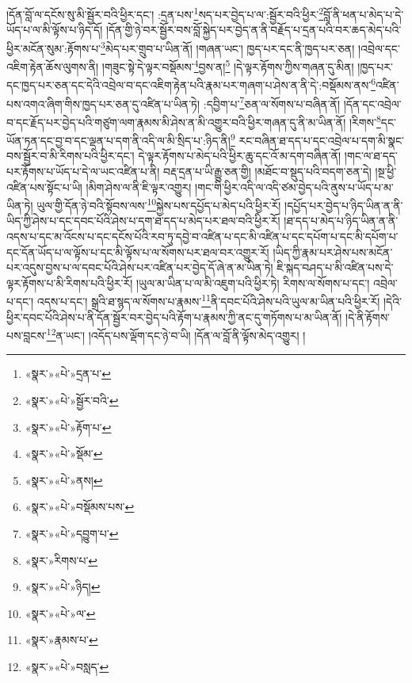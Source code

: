 །དོན་བློ་ལ་དངོས་སུ་མི་སྦྱོར་བའི་ཕྱིར་དང་། :དྲན་པས་\footnote{«སྣར་»«པེ་»དྲན་པ་}སད་པར་བྱེད་པ་ལ་:སྦྱོར་བའི་ཕྱིར་\footnote{«སྣར་»«པེ་»སྦྱོར་བའི་}བློ་ནི་ཕན་པ་མེད་པ་དེ་ཡོད་པ་ལ་མི་ལྟོས་པ་ཉིད་དོ། །དོན་གྱི་ཉེ་བར་སྦྱོར་བས་བློ་སྐྱེད་པར་བྱེད་ན་ནི་བརྗོད་པ་དྲན་པའི་བར་ཆད་མེད་པའི་ཕྱིར་མངོན་སུམ་:རྟོགས་པ་\footnote{«སྣར་»«པེ་»རྟོག་པ་}མེད་པར་གྲུབ་པ་ཡིན་ནོ། །གཞན་ཡང་། ཁྱད་པར་དང་ནི་ཁྱད་པར་ཅན། །འབྲེལ་དང་འཇིག་རྟེན་ཆོས་ལུགས་ནི། །གཟུང་སྟེ་དེ་ལྟར་བསྡོམས་\footnote{«སྣར་»«པེ་»སྡོམ་}བྱས་ན།\footnote{«སྣར་»«པེ་»ནས།} །དེ་ལྟར་རྟོགས་ཀྱིས་གཞན་དུ་མིན། །ཁྱད་པར་དང་ཁྱད་པར་ཅན་དང་དེའི་འབྲེལ་བ་དང་འཇིག་རྟེན་པའི་རྣམ་པར་གཞག་པ་ཤེས་ན་ནི་དེ་:བསྡོམས་ནས་\footnote{«སྣར་»«པེ་»བསྡོམས་པས་}འཛིན་པས་འགའ་ཞིག་གིས་ཁྱད་པར་ཅན་དུ་འཛིན་པ་ཡིན་ཏེ། :དབྱིག་པ་\footnote{«སྣར་»«པེ་»དབྱུག་པ་}ཅན་ལ་སོགས་པ་བཞིན་ནོ། །དོན་དང་འབྲེལ་བ་དང་རྗོད་པར་བྱེད་པའི་གཙུག་ལག་རྣམས་མི་ཤེས་ན་མི་འགྱུར་བའི་ཕྱིར་གཞན་དུ་ནི་མ་ཡིན་ནོ། །རིགས་\footnote{«སྣར་»རིགས་པ་}དང་ཡོན་ཏན་དང་བྱ་བ་དང་ལྡན་པ་དག་ནི་འདི་ལ་མི་སྲིད་པ་:ཉིད་ནི།\footnote{«སྣར་»«པེ་»ཉིད།} རང་བཞིན་ཐ་དད་པ་དང་འབྲེལ་པ་དག་མི་སྣང་བས་སྦྱོར་བ་མི་རིགས་པའི་ཕྱིར་དང་། དེ་ལྟར་རྟོགས་པ་མེད་པའི་ཕྱིར་ཆུ་དང་འོ་མ་དག་བཞིན་ནོ། །གང་ལ་ཐ་དད་པར་རྟོགས་པ་ཡོད་པ་དེ་ལ་ཡང་འཛིན་པ་ནི། བརྡ་དྲན་པ་ཡི་རྒྱུ་ཅན་གྱི། །མཐོང་བ་སྡུད་པའི་བདག་ཅན་དེ། །སྔ་ཕྱི་འཛིན་པས་སྟོང་པ་ཡི། །མིག་ཤེས་ལ་ནི་ཇི་ལྟར་འགྱུར། །གང་གི་ཕྱིར་འདི་ལ་འདི་ཙམ་བྱེད་པའི་ནུས་པ་ཡོད་པ་མ་ཡིན་ཏེ། ཡུལ་གྱི་དོན་ཉེ་བའི་སྟོབས་ལས་\footnote{«སྣར་»«པེ་»ལ་}སྐྱེས་པས་དཔྱོད་པ་མེད་པའི་ཕྱིར་རོ། །དཔྱོད་པར་བྱེད་པ་ཉིད་ཡིན་ན་ནི་ཡིད་ཀྱི་ཤེས་པ་དང་དབང་པོའི་ཤེས་པ་དག་ཐ་དད་པ་མེད་པར་ཐལ་བའི་ཕྱིར་རོ། །ཐ་དད་པ་མེད་པ་ཉིད་ཡིན་ན་ནི་འདས་པ་དང་མ་འོངས་པ་དང་དངོས་པོའི་རབ་ཏུ་དབྱེ་བ་འཛིན་པ་དང་མི་འཛིན་པ་དང་དཔོག་པ་དང་མི་དཔོག་པ་དང་དོན་ཡོད་པ་ལ་ལྟོས་པ་དང་མི་ལྟོས་པ་ལ་སོགས་པར་ཐལ་བར་འགྱུར་རོ། །ཡིད་ཀྱི་རྣམ་པར་ཤེས་པས་མངོན་པར་འདུས་བྱས་པ་ལ་དབང་པོའི་ཤེས་པར་འཛིན་པར་བྱེད་དོ་ཞེ་ན་མ་ཡིན་ཏེ། ཇི་སྐད་བཤད་པ་མི་འཛིན་པས་དེ་ལྟར་རྟོགས་པ་མི་རིགས་པའི་ཕྱིར་རོ། །ཡུལ་མ་ཡིན་པ་ལ་མི་འཇུག་པའི་ཕྱིར་ཏེ། རིགས་ལ་སོགས་པ་དང་། འབྲེལ་པ་དང་། འདས་པ་དང་། སྒྲའི་ཐ་སྙད་ལ་སོགས་པ་རྣམས་\footnote{«སྣར་»རྣམས་པ་}ནི་དབང་པོའི་ཤེས་པའི་ཡུལ་མ་ཡིན་པའི་ཕྱིར་རོ། །དེའི་ཕྱིར་དབང་པོའི་ཤེས་པ་ནི་དོན་སྦྱོར་བར་བྱེད་པའི་རྟོག་པ་རྣམས་ཀྱི་ནང་དུ་གཏོགས་པ་མ་ཡིན་ནོ། །དེ་ནི་རྟོགས་པས་བླངས་\footnote{«སྣར་»«པེ་»བསླད་}ན་ཡང་། །འདོད་པས་ལྡོག་དང་ཉེ་བ་ཡི། །དོན་ལ་བློ་ནི་ལྟོས་མེད་འགྱུར། །
